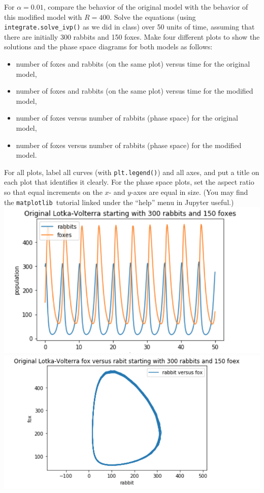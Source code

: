 \documentclass[11pt]{article}
\newcommand{\matplotlib}{{\tt matplotlib}}  %
\begin{document}
For $\alpha = 0.01$, compare the behavior of the original model
with the behavior of this modified model with $R = 400$.
Solve the equations (using {\tt integrate.solve\_ivp()} as we did in class)
over 50 units of time, 
assuming that there are initially 300 rabbits and 150 foxes.
Make four different plots to show the solutions and the phase
space diagrams for both models as follows:
\begin{itemize}
\item number of foxes and rabbits (on the same plot) versus time for the original model,
\item number of foxes and rabbits (on the same plot) versus time for the modified model,
\item number of foxes versus number of rabbits (phase space) for the original model,
\item number of foxes versus number of rabbits (phase space) for the modified model.
\end{itemize}
For all plots, label all curves (with {\tt plt.legend()}) and all axes,
and put a title on each plot that identifies it clearly.
For the phase space plots, set the aspect
ratio so that equal increments on the $x$- and $y$-axes are equal in size.
(You may find the \matplotlib\ tutorial linked under the ``help'' menu
in Jupyter useful.)\\
\includegraphics[scale = 0.65]{31}\includegraphics[scale = 0.65]{32.png}\\
\end{document}
